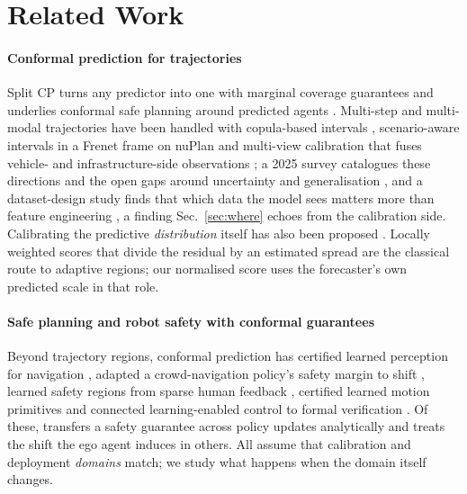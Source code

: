 \section{Related Work}
\paragraph{Conformal prediction for trajectories}
Split CP turns any predictor into one with marginal coverage guarantees \cite{vovk2005algorithmic,angelopoulos2023gentle} and
underlies conformal safe planning around predicted agents \cite{lindemann2023safe}. Multi-step and multi-modal trajectories have been
handled with copula-based intervals \cite{sun2024copula}, scenario-aware intervals in a Frenet frame on nuPlan
\cite{shu2025scenario} and multi-view calibration that fuses vehicle- and infrastructure-side observations \cite{chen2024v2i}; a
2025 survey catalogues these directions and the open gaps around uncertainty and generalisation \cite{abdelmadjid2025survey}, and a
dataset-design study finds that which data the model sees matters more than feature engineering \cite{demmler2025dataset}, a finding
Sec.~\ref{sec:where} echoes from the calibration side. Calibrating the predictive \emph{distribution} itself has also been
proposed \cite{pouria2026gaussian}. Locally weighted scores that divide the residual by an estimated spread
\cite{lei2018distribution} are the classical route to adaptive regions; our normalised score uses the forecaster's own predicted
scale in that role.

\paragraph{Safe planning and robot safety with conformal guarantees}
Beyond trajectory regions, conformal prediction has certified learned perception for navigation \cite{mei2024perceive}, adapted a
crowd-navigation policy's safety margin to shift \cite{yao2025crowdnav}, learned safety regions from sparse human feedback
\cite{feldman2025robotsafety}, certified learned motion primitives \cite{binny2026stable} and connected learning-enabled control to
formal verification \cite{lindemann2024formal}. Of these, \cite{mirzaeedodangeh2025interactive} transfers a safety guarantee across
policy updates analytically and \cite{binny2025moved} treats the shift the ego agent induces in others. All assume that calibration
and deployment \emph{domains} match; we study what happens when the domain itself changes.

